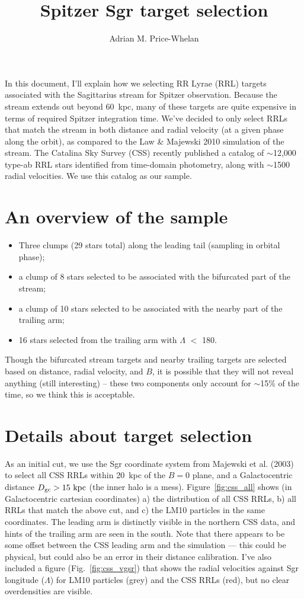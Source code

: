 \documentclass[letterpaper,12pt,preprint]{aastex}
\begin{document}
\title{Spitzer Sgr target selection}
\author{Adrian M. Price-Whelan}

In this document, I'll explain how we selecting RR Lyrae (RRL) targets associated with the Sagittarius stream for Spitzer observation. Because the stream extends out beyond 60~kpc, many of these targets are quite expensive in terms of required Spitzer integration time. We've decided to only select RRLs that match the stream in both distance and radial velocity (at a given phase along the orbit), as compared to the Law \& Majewski 2010 simulation of the stream. The Catalina Sky Survey (CSS) recently published a catalog of $\sim$12,000 type-ab RRL stars identified from time-domain photometry, along with $\sim$1500 radial velocities. We use this catalog as our sample.

\section{An overview of the sample}
\begin{itemize}
	\item Three clumps (29 stars total) along the leading tail (sampling in orbital phase);
	\item a clump of 8 stars selected to be associated with the bifurcated part of the stream;
	\item a clump of 10 stars selected to be associated with the nearby part of the trailing arm;
	\item 16 stars selected from the trailing arm with $\Lambda$ $<$ 180.
\end{itemize}
Though the bifurcated stream targets and nearby trailing targets are selected based on distance, radial velocity, and $B$, it is possible that they will not reveal anything (still interesting) -- these two components only account for $\sim$15\% of the time, so we think this is acceptable.

\section{Details about target selection}

As an initial cut, we use the Sgr coordinate system from Majewski et al. (2003) to select all CSS RRLs within 20~kpc of the $B=0$ plane, and a Galactocentric distance $D_{\rm gc} > 15~{\rm kpc}$ (the inner halo is a mess). Figure~\ref{fig:css_all} shows (in Galactocentric cartesian coordinates) a) the distribution of all CSS RRLs, b) all RRLs that match the above cut, and c) the LM10 particles in the same coordinates. The leading arm is distinctly visible in the northern CSS data, and hints of the trailing arm are seen in the south. Note that there appears to be some offset between the CSS leading arm and the simulation --- this could be physical, but could also be an error in their distance calibration. I've also included a figure (Fig.~\ref{fig:css_vgsr}) that shows the radial velocities against Sgr longitude ($\Lambda$) for LM10 particles (grey) and the CSS RRLs (red), but no clear overdensities are visible.
\end{document}
